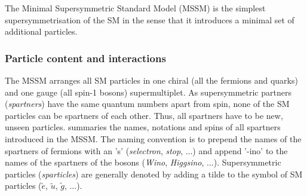 The Minimal Supersymmetric Standard Model (MSSM) is the simplest supersymmetrisation of the SM in the sense that it introduces a minimal set of additional particles.

\subsubsection{Particle content and interactions}\label{sec:mssm_particle_content}

The MSSM arranges all SM particles in one chiral (all the fermions and quarks) and one gauge (all spin-1 bosons) supermultiplet. As supersymmetric partners (\textit{spartners}) have the same quantum numbers apart from spin, none of the SM particles can be spartners of each other. Thus, all spartners have to be new, unseen particles.  summaries the names, notations and spins of all spartners introduced in the MSSM. The naming convention is to prepend the names of the spartners of fermions with an 's' (\eg \textit{selectron}, \textit{stop}, ...) and append '-ino' to the names of the spartners of the bosons (\eg \textit{Wino}, \textit{Higgsino}, ...). Supersymmetric particles (\textit{sparticles}) are generally denoted by adding a tilde to the symbol of SM particles (\eg $\tilde{e}$, $\tilde{u}$, $\tilde{g}$, ...). 

